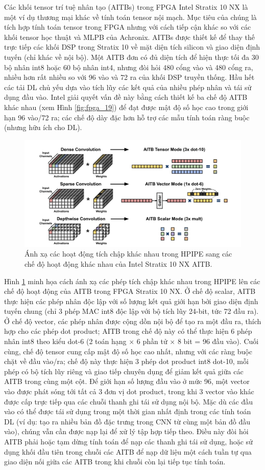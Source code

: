 \documentclass[a4paper]{article}
\begin{document}
Các khối tensor trí tuệ nhân tạo (AITBs) trong FPGA Intel Stratix 10 NX là một ví dụ thương mại khác về tính toán tensor nội mạch. Mục tiêu của chúng là tích hợp tính toán tensor trong FPGA nhưng với cách tiếp cận khác so với các khối tensor học thuật và MLPB của Achronix. AITBs được thiết kế để thay thế trực tiếp các khối DSP trong Stratix 10 về mặt diện tích silicon và giao diện định tuyến (chỉ khác về nội bộ). Một AITB đơn có đủ diện tích để hiện thực tối đa 30 bộ nhân int8 hoặc 60 bộ nhân int4, nhưng đòi hỏi 480 cổng vào và 480 cổng ra, nhiều hơn rất nhiều so với 96 vào và 72 ra của khối DSP truyền thống. Hầu hết các tải DL chủ yếu dựa vào tích lũy các kết quả của nhiều phép nhân và tái sử dụng đầu vào. Intel giải quyết vấn đề này bằng cách thiết kế ba chế độ AITB khác nhau (xem Hình \ref{fig:fpga_19}) để đạt được mật độ số học cao trong giới hạn 96 vào/72 ra; các chế độ dày đặc hơn hỗ trợ các mẫu tính toán ràng buộc (nhưng hữu ích cho DL).
\begin{figure} [!h]
    \centering
    \includegraphics[width=0.75\linewidth]{assets/fpga_20.png}
    \caption{Ánh xạ các hoạt động tích chập khác nhau trong HPIPE sang các chế độ hoạt động khác nhau của Intel Stratix 10 NX AITB.}
    \label{fig:fpga_20}
\end{figure}
Hình \ref{fig:fpga_20} minh họa cách ánh xạ các phép tích chập khác nhau trong HPIPE lên các chế độ hoạt động của AITB trong FPGA Stratix 10 NX. Ở chế độ scalar, AITB thực hiện các phép nhân độc lập với số lượng kết quả giới hạn bởi giao diện định tuyến chung (chỉ 3 phép MAC int8 độc lập với bộ tích lũy 24-bit, tức 72 đầu ra). Ở chế độ vector, các phép nhân được cộng dồn nội bộ để tạo ra một đầu ra, thích hợp cho các phép dot product; AITB trong chế độ này có thể thực hiện 6 phép nhân int8 theo kiểu dot-6 (2 toán hạng × 6 phần tử × 8 bit = 96 đầu vào). Cuối cùng, chế độ tensor cung cấp mật độ số học cao nhất, nhưng với các ràng buộc chặt về đầu vào/ra; chế độ này thực hiện 3 phép dot product int8 dot-10, mỗi phép có bộ tích lũy riêng và giao tiếp chuyên dụng để giảm kết quả giữa các AITB trong cùng một cột. Để giới hạn số lượng đầu vào ở mức 96, một vector vào được phát sóng tới tất cả 3 đơn vị dot product, trong khi 3 vector vào khác được cấp trực tiếp qua các chuỗi thanh ghi tái sử dụng nội bộ. Mặc dù các đầu vào có thể được tái sử dụng trong một thời gian nhất định trong các tính toán DL (ví dụ: tạo ra nhiều bản đồ đặc trưng trong CNN từ cùng một bản đồ đầu vào), chúng vẫn cần được nạp lại để xử lý tập hợp tiếp theo. Điều này đòi hỏi AITB phải hoặc tạm dừng tính toán để nạp các thanh ghi tái sử dụng, hoặc sử dụng khối đầu tiên trong chuỗi các AITB để nạp dữ liệu một cách tuần tự qua giao diện nối giữa các AITB trong khi chuỗi còn lại tiếp tục tính toán.
\end{document}
